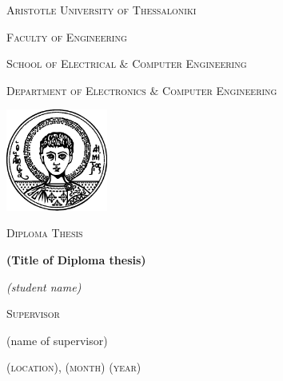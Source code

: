 \begin{titlepage}
	\centering
	{\scshape\Large Aristotle University of Thessaloniki \par}
	{\scshape\Large Faculty of Engineering \par}
	\vspace{0.2cm}
	{\scshape\large School of Electrical $\&$ Computer Engineering \par}
	{\scshape\large Department of Electronics $\&$ Computer Engineering \par}
	\vspace{0.5cm}
	\includegraphics[width=0.25\textwidth]{assets/images/auth_logo_black.eps} \par
	\vspace{1cm}
	{\scshape\Large Diploma Thesis \par}
	\vspace{0.3cm}
	{\huge\bfseries (Title of Diploma thesis) \par}
	\vspace{2cm}
	{\Large\itshape (student name) \par}
	\vfill
	{\scshape\large Supervisor \par}
	{\large (name of supervisor)}
	\vfill
	{\scshape\large (location), (month) (year)\par}
\end{titlepage}
